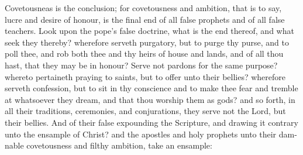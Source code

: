 \documentclass{custom}
\begin{document}
Covetousneas is the conclusion; for covetousness and 
ambition, that is to say, lucre and desire of honour, is the 
final end of all false prophets and of all false teachers. 
Look upon the pope's false doctrine, what is the end 
thereof, and what seek they thereby? wherefore serveth 
purgatory, but to purge thy purse, and to poll thee, and 
rob both thee and thy heirs of house and lands, and of all 
thou hast, that they may be in honour? Serve not pardons 
for the same purpose? whereto pertaineth praying to 
saints, but to offer unto their bellies? wherefore serveth 
confession, but to sit in thy conscience and to make thee 
fear and tremble at whatsoever they dream, and that thou 
worship them as gods? and so forth, in all their traditions, 
ceremonies, and conjurations, they serve not the Lord, 
but their bellies. And of their false expounding the 
Scripture, and drawing it contrary unto the ensample of 
Christ? and the apostles and holy prophets unto their dam- 
nable covetousness and filthy ambition, take an ensample: 
\end{document}
